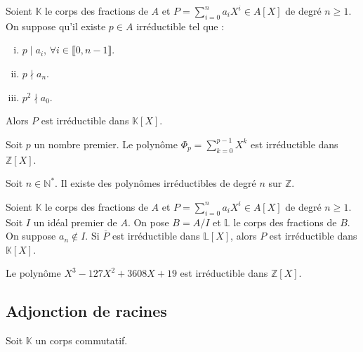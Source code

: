 	
	\begin{theorem}
		Soient $\mathbb{K}$ le corps des fractions de $A$ et $P = \sum_{i=0}^n a_i X^i \in A[X]$ de degré $n \geq 1$. On suppose qu'il existe $p \in A$ irréductible tel que :
		\begin{enumerate}[(i)]
			\item $p \mid a_i$, $\forall i \in \llbracket 0, n-1 \rrbracket$.
			\item $p \nmid a_n$.
			\item $p^2 \nmid a_0$.
		\end{enumerate}
		Alors $P$ est irréductible dans $\mathbb{K}[X]$.
	\end{theorem}
	
	\begin{example}
		Soit $p$ un nombre premier. Le polynôme $\Phi_p = \sum_{k=0}^{p-1} X^k$ est irréductible dans $\mathbb{Z}[X]$. 
	\end{example}
	
	
	\begin{application}
		\label{141-3}
		Soit $n \in \mathbb{N}^*$. Il existe des polynômes irréductibles de degré $n$ sur $\mathbb{Z}$.
	\end{application}
	
	
	\begin{theorem}
		Soient $\mathbb{K}$ le corps des fractions de $A$ et $P = \sum_{i=0}^n a_i X^i \in A[X]$ de degré $n \geq 1$. Soit $I$ un idéal premier de $A$. On pose $B=A/I$ et $\mathbb{L}$ le corps des fractions de $B$. On suppose $a_n \notin I$.
		\newpar
		Si $\overline{P}$ est irréductible dans $\mathbb{L}[X]$, alors $P$ est irréductible dans $\mathbb{K}[X]$.
	\end{theorem}
	
	\begin{example}
		Le polynôme $X^3-127X^2+3608X+19$ est irréductible dans $\mathbb{Z}[X]$. 
	\end{example}
	
	\newpage
	
	\subsection{Adjonction de racines}
	
	Soit $\mathbb{K}$ un corps commutatif.
	
